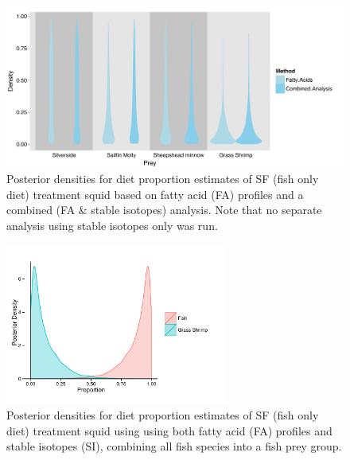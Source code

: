 \documentclass[fleqn,10pt]{wlpeerj}
\begin{document}
\begin{figure}
  \begin{center}
    \includegraphics[width=1\textwidth]{figures/SF_comp_plot.pdf}   
    \caption{Posterior densities for diet proportion estimates of SF
      (fish only diet) treatment squid based on fatty acid (FA) profiles and a combined
      (FA \& stable isotopes) analysis. Note that no separate analysis using stable isotopes
      only was run.}
    \label{fig:pop_comp_SF}
  \end{center}
\end{figure}

\begin{figure}
  \begin{center}
    \includegraphics[width=0.65\textwidth]{figures/Fish_plot.pdf}   
    \caption{Posterior densities for diet proportion estimates of SF
      (fish only diet) treatment squid using using both fatty acid (FA) profiles and stable isotopes (SI),
      combining all fish species into a fish prey group.}
    \label{fig:Fish_plot}
  \end{center}
\end{figure}


\end{document}

